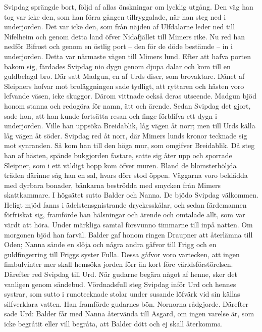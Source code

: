Svipdag sprängde bort, följd af allas önskningar om lycklig utgång. Den
väg han tog var icke den, som han förra gången tillryggalade, när han
steg ned i underjorden. Det var icke den, som från näjden af Ulfdalarne
leder ned till Nifelheim och genom detta land öfver Nidafjället till
Mimers rike. Nu red han nedför Bifrost och genom en östlig port -- den
för de döde bestämde -- in i underjorden. Detta var närmaste
\protect\hypertarget{lb1625905.xhtmlux5cux23start130}{}{}\protect\hypertarget{lb1625905.xhtmlux5cux23start130-a}{}{}\protect\hypertarget{lb1625905.xhtmlux5cux23start130-b}{}{}\protect\hypertarget{lb1625905.xhtmlux5cux23start130-c}{}{}\protect\hypertarget{lb1625905.xhtmlux5cux23start130-d}{}{}
vägen till Mimers lund. Efter att hafva porten bakom sig, färdades
Svipdag nio dygn genom djupa dalar och kom till en guldbelagd bro. Där
satt Madgun, en af Urds diser, som brovaktare. Dånet af Sleipners hofvar
mot broläggningen sade tydligt, att ryttaren och hästen voro lefvande
väsen, icke skuggor. Därom vittnade också deras utseende. Madgun bjöd
honom stanna och redogöra för namn, ätt och ärende. Sedan Svipdag det
gjort, sade hon, att han kunde fortsätta resan och finge förblifva ett
dygn i underjorden. Ville han uppsöka Breidablik, låg vägen åt norr; men
till Urds källa låg vägen åt söder. Svipdag red åt norr, där Mimers
lunds kronor tecknade sig mot synranden. Så kom han till den höga mur,
som omgifver Breidablik. Då steg han af hästen, spände bukgjorden
fastare, satte sig åter upp och sporrade Sleipner, som i ett väldigt
hopp kom öfver muren. Bland de blomsterhöljda träden därinne såg han en
sal, hvars dörr stod öppen. Väggarna voro beklädda med dyrbara bonader,
bänkarna beströdda med smycken från Mimers skattkammare. I högsätet
sutto Balder och Nanna. De bjödo Svipdag välkommen. Heligt mjöd fanns i
ädelstensgnistrande dryckesskålar, och sedan färdemannen förfriskat sig,
framförde han hälsningar och ärende och omtalade allt, som var värdt att
höra. Under märkliga samtal försvunno timmarne till inpå natten. Om
morgonen bjöd han farväl. Balder gaf honom ringen Draupner att återlämna
till Oden; Nanna sände en slöja och några andra gåfvor till Frigg och en
guldfingerring till Friggs syster Fulla. Dessa gåfvor voro vartecken,
att ingen fimbulvinter mer skall hemsöka jorden förr än kort före
världsförstörelsen. Därefter red Svipdag till Urd. När gudarne begära
något af henne, sker det vanligen genom sändebud. Vördnadsfull steg
Svipdag inför Urd och hennes systrar, som sutto i runotecknade stolar
under susande löfvärk vid sin källas silfverklara vatten. Han framförde
gudarnes bön. Nornorna rådgjorde. Därefter sade Urd: Balder får med
Nanna återvända till Asgard, om ingen varelse är, som icke begråtit
eller vill begråta, att Balder dött och ej skall återkomma.

